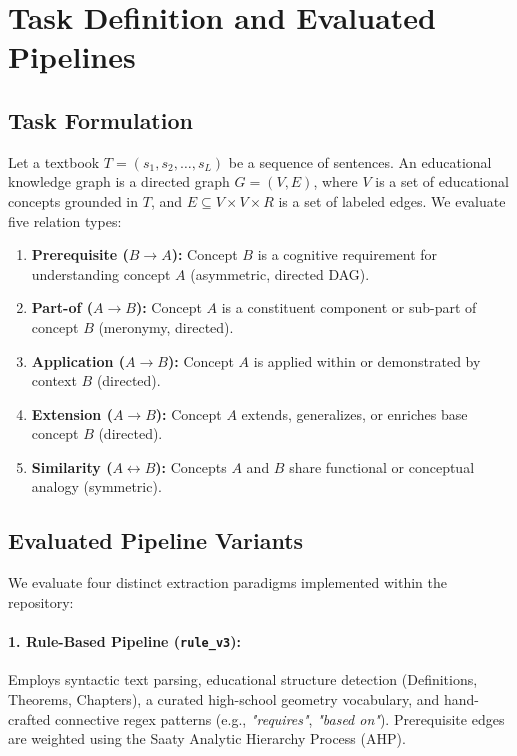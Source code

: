 \documentclass[11pt,a4paper]{article}
\begin{document}
\section{Task Definition and Evaluated Pipelines}

\subsection{Task Formulation}
Let a textbook $T = (s_1, s_2, \dots, s_L)$ be a sequence of sentences. An educational knowledge graph is a directed graph $G = (V, E)$, where $V$ is a set of educational concepts grounded in $T$, and $E \subseteq V \times V \times R$ is a set of labeled edges. We evaluate five relation types:
\begin{enumerate}[leftmargin=*,itemsep=1pt]
  \item \textbf{Prerequisite ($B \to A$):} Concept $B$ is a cognitive requirement for understanding concept $A$ (asymmetric, directed DAG).
  \item \textbf{Part-of ($A \to B$):} Concept $A$ is a constituent component or sub-part of concept $B$ (meronymy, directed).
  \item \textbf{Application ($A \to B$):} Concept $A$ is applied within or demonstrated by context $B$ (directed).
  \item \textbf{Extension ($A \to B$):} Concept $A$ extends, generalizes, or enriches base concept $B$ (directed).
  \item \textbf{Similarity ($A \leftrightarrow B$):} Concepts $A$ and $B$ share functional or conceptual analogy (symmetric).
\end{enumerate}

\subsection{Evaluated Pipeline Variants}
We evaluate four distinct extraction paradigms implemented within the repository:

\paragraph{1. Rule-Based Pipeline (\texttt{rule\_v3}):}
Employs syntactic text parsing, educational structure detection (Definitions, Theorems, Chapters), a curated high-school geometry vocabulary, and hand-crafted connective regex patterns (e.g., \textit{"requires"}, \textit{"based on"}). Prerequisite edges are weighted using the Saaty Analytic Hierarchy Process (AHP).
\end{document}
